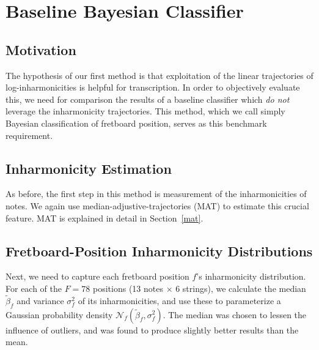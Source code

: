 \documentclass[12pt]{cmuthesis}
\begin{document}
\section{Baseline Bayesian Classifier}
\subsection{Motivation}
The hypothesis of our first method is that exploitation of the linear trajectories of log-inharmonicities is helpful for transcription. In order to objectively evaluate this, we need for comparison the results of a baseline classifier which \textit{do not} leverage the inharmonicity trajectories. This method, which we call simply Bayesian classification of fretboard position, serves as this benchmark requirement. 

\subsection{Inharmonicity Estimation}
As before, the first step in this method is measurement of the inharmonicities of notes. We again use median-adjustive-trajectories (MAT) to estimate this crucial feature. MAT is explained in detail in Section~\ref{mat}.

\subsection{Fretboard-Position Inharmonicity Distributions}
Next, we need to capture each fretboard position $f$'s inharmonicity distribution. For each of the $F=78$ positions (13 notes $\times$ 6 strings), we calculate the median $\tilde{\beta}_f$ and variance $\sigma^2_f$ of its inharmonicities, and use these to parameterize a Gaussian probability density $\mathcal{N}_f(\tilde{\beta}_f,\sigma^2_f)$. The median was chosen to lessen the influence of outliers, and was found to produce slightly better results than the mean.
\end{document}
